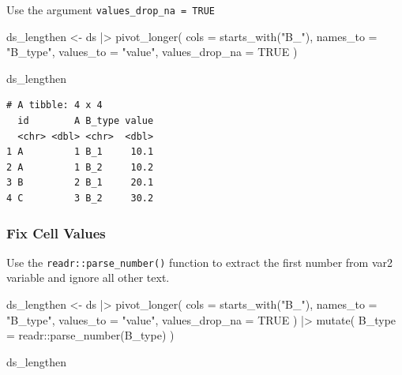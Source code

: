 \documentclass[
  letterpaper,
  DIV=11,
  numbers=noendperiod]{scrreprt}
\newenvironment{Shaded}{\begin{snugshade}}{\end{snugshade}}
\newcommand{\AttributeTok}[1]{\textcolor[rgb]{0.40,0.45,0.13}{#1}}
\newcommand{\ConstantTok}[1]{\textcolor[rgb]{0.56,0.35,0.01}{#1}}
\newcommand{\FunctionTok}[1]{\textcolor[rgb]{0.28,0.35,0.67}{#1}}
\newcommand{\NormalTok}[1]{\textcolor[rgb]{0.00,0.23,0.31}{#1}}
\newcommand{\OtherTok}[1]{\textcolor[rgb]{0.00,0.23,0.31}{#1}}
\newcommand{\SpecialCharTok}[1]{\textcolor[rgb]{0.37,0.37,0.37}{#1}}
\newcommand{\StringTok}[1]{\textcolor[rgb]{0.13,0.47,0.30}{#1}}
\begin{document}
Use the argument \texttt{values\_drop\_na\ =\ TRUE}

\begin{Shaded}
\begin{Highlighting}[]
\NormalTok{ds\_lengthen }\OtherTok{\textless{}{-}}\NormalTok{ ds }\SpecialCharTok{|\textgreater{}} 
  \FunctionTok{pivot\_longer}\NormalTok{(}
    \AttributeTok{cols =} \FunctionTok{starts\_with}\NormalTok{(}\StringTok{"B\_"}\NormalTok{),}
    \AttributeTok{names\_to =} \StringTok{"B\_type"}\NormalTok{,}
    \AttributeTok{values\_to =} \StringTok{"value"}\NormalTok{,}
    \AttributeTok{values\_drop\_na =} \ConstantTok{TRUE}
\NormalTok{  )}

\NormalTok{ds\_lengthen}
\end{Highlighting}
\end{Shaded}

\begin{verbatim}
# A tibble: 4 x 4
  id        A B_type value
  <chr> <dbl> <chr>  <dbl>
1 A         1 B_1     10.1
2 A         1 B_2     10.2
3 B         2 B_1     20.1
4 C         3 B_2     30.2
\end{verbatim}

\subsubsection{Fix Cell Values}\label{fix-cell-values}

Use the \texttt{readr::parse\_number()} function to extract the first
number from var2 variable and ignore all other text.

\begin{Shaded}
\begin{Highlighting}[]
\NormalTok{ds\_lengthen }\OtherTok{\textless{}{-}}\NormalTok{ ds }\SpecialCharTok{|\textgreater{}} 
  \FunctionTok{pivot\_longer}\NormalTok{(}
    \AttributeTok{cols =} \FunctionTok{starts\_with}\NormalTok{(}\StringTok{"B\_"}\NormalTok{),}
    \AttributeTok{names\_to =} \StringTok{"B\_type"}\NormalTok{,}
    \AttributeTok{values\_to =} \StringTok{"value"}\NormalTok{,}
    \AttributeTok{values\_drop\_na =} \ConstantTok{TRUE}
\NormalTok{  ) }\SpecialCharTok{|\textgreater{}} 
  \FunctionTok{mutate}\NormalTok{(}
    \AttributeTok{B\_type =}\NormalTok{ readr}\SpecialCharTok{::}\FunctionTok{parse\_number}\NormalTok{(B\_type)}
\NormalTok{  )}

\NormalTok{ds\_lengthen}
\end{Highlighting}
\end{Shaded}
\end{document}

